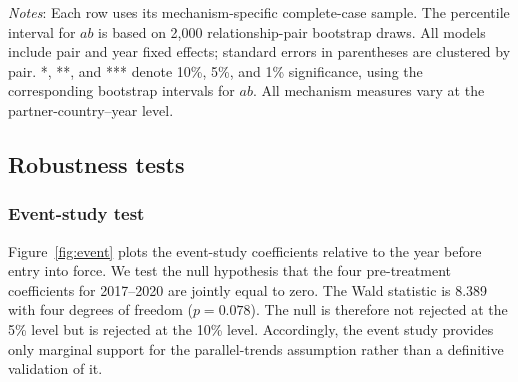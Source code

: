 \documentclass[preprint,12pt,authoryear]{elsarticle}
\begin{document}
\begin{table}[H]
\centering
\caption{Policy-linked mechanism evidence}
\label{tab:mechanisms}
\small
\begin{minipage}{\textwidth}
\centering
\smallskip
{}
\vspace{2pt}
\parbox[t]{\textwidth}{\footnotesize \textit{Notes}: Each row uses its mechanism-specific complete-case sample. The percentile interval for $ab$ is based on 2,000 relationship-pair bootstrap draws. All models include pair and year fixed effects; standard errors in parentheses are clustered by pair. *, **, and *** denote 10\%, 5\%, and 1\% significance, using the corresponding bootstrap intervals for $ab$. All mechanism measures vary at the partner-country--year level.}
\end{minipage}
\end{table}
 
\subsection{Robustness tests}

\subsubsection{Event-study test}

Figure~\ref{fig:event} plots the event-study coefficients relative to the year before entry into force. We test the null hypothesis that the four pre-treatment coefficients for 2017--2020 are jointly equal to zero. The Wald statistic is 8.389 with four degrees of freedom ($p=0.078$). The null is therefore not rejected at the 5\% level but is rejected at the 10\% level. Accordingly, the event study provides only marginal support for the parallel-trends assumption rather than a definitive validation of it.
\end{document}
